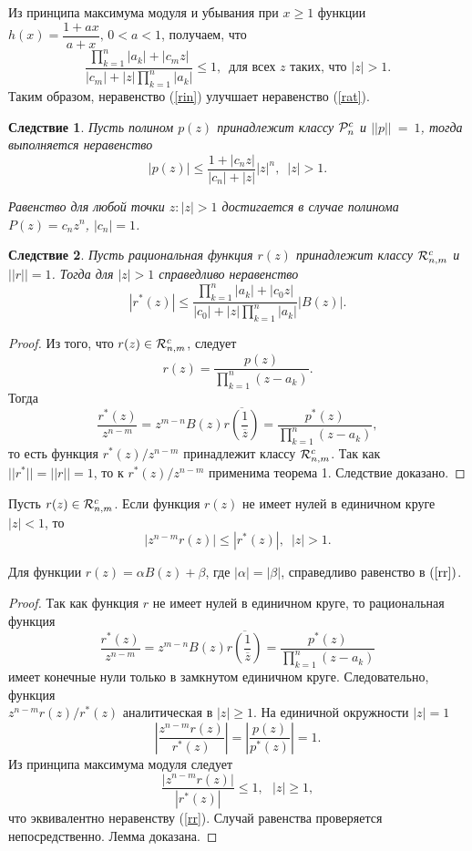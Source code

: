 \documentclass[a4paper,12pt,twoside]{article}
\newtheorem{cor}{\indent  Следствие}
\begin{document}
Из принципа максимума модуля и убывания при $x\geq1$ функции
$h(x)=\dfrac{1+ax}{a+x}, \, 0<a<1$, получаем, что
$$
\frac{\displaystyle
\prod\limits_{k=1}^{n}|a_k|+|c_mz|}{\displaystyle
|c_m|+|z|\prod\limits_{k=1}^{n}|a_k|}\leq1, \, \, \, \mbox{для всех $z$ таких, что} \, \, |z|>1.
$$
Таким образом, неравенство (\ref{rin}) улучшает неравенство
(\ref{rat}).


\begin{cor} Пусть полином $p(z)$ принадлежит классу ${\cal P}_n^c$ и
$||p||~=~1$, тогда  выполняется неравенство
$$
|p(z)|\leq \frac{\displaystyle
1+|c_nz|}{\displaystyle
|c_n|+|z|}|z|^{n}, \, \, \, |z|>1.
$$

Равенство для любой точки $z: |z|>1$  достигается в случае
полинома $P(z) = c_nz^n$, $ |c_n|=1$. \end{cor}

\begin{cor}  Пусть рациональная функция $r(z)$ принадлежит
классу ${\cal R}_{n,m}^c$ и $||r||=1$. Тогда для $|z|>1$
справедливо неравенство
$$
|r^{*}(z)|\leq \frac{\displaystyle
\prod\limits_{k=1}^{n}|a_k|+|c_0z|}{\displaystyle
|c_0|+|z|\prod\limits_{k=1}^{n}|a_k|}|B(z)|.
$$
\end{cor}

\begin{proof} Из того, что $r(z)\in {\cal R}_{n,m}^c$,
следует
$$
r(z) =
\frac{p(z)}{\prod\limits_{k=1}^{n}(z-a_k)}.
$$
Тогда
$$
\frac{r^{*}(z)}{z^{n-m}}=z^{m-n}B(z)\overline{r\left(\frac{1}{\overline{z}}
\right)}=\frac{p^{*}(z)}{\prod\limits_{k=1}^{n}(z-a_k)},
$$
то есть функция $r^{*}(z)/z^{n-m}$  принадлежит классу ${\cal
R}_{n,m}^c$. Так как $||r^{*}||=||r||=1$, то к $r^{*}(z)/z^{n-m}$
применима теорема 1. Следствие доказано.
\end{proof}

\begin{lem} Пусть $r(z)\in {\cal R}_{n,m}^c$. Если  функция $r(z)$ не
имеет нулей в единичном круге $|z|<1$, то
\begin{equation}\label{rr}
|z^{n-m}r(z)|\leq|r^{*}(z)|, \,\,\, |z|>1.
\end{equation}

Для функции $r(z)=\alpha B(z)+\beta$, где $|\alpha|=|\beta|$,
справедливо равенство в $(\ref{rr})$.
\end{lem}

\begin{proof} Так как функция $r$ не имеет нулей в
единичном круге, то рациональная функция
$$
\frac{r^{*}(z)}{z^{n-m}}=z^{m-n}B(z)\overline{r\left(\frac{1}{\overline{z}}
\right)}=\frac{p^{*}(z)}{\prod\limits_{k=1}^{n}(z-a_k)}
$$
имеет конечные нули только в замкнутом единичном круге.
Следовательно, функция \\ $z^{n-m}r(z)/r^{*}(z)$ аналитическая в
$|z|\geq1$. На единичной окружности $|z|=1$
$$
\left|\frac{z^{n-m}r(z)}{r^{*}(z)}\right|=\left|\frac{p(z)}{p^{*}(z)}\right|=1.
$$
Из принципа максимума модуля следует
$$
\frac{|z^{n-m}r(z)|}{|r^{*}(z)|}\leq1, \, \, \, \, |z|\geq1,
$$
что эквивалентно  неравенству (\ref{rr}). Случай равенства
проверяется непосредственно. Лемма доказана.
\end{proof}
\end{document}
